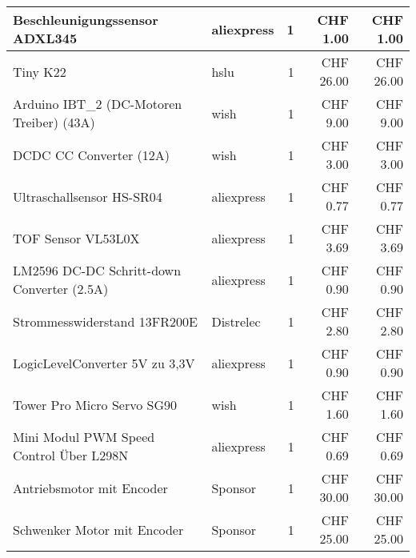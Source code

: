 \documentclass[../../main.tex]{subfiles}
\begin{document}
\begin{table}[H]
\begin{tabular}{|p{6cm}|l|r|r|r|}
    Beschleunigungssensor ADXL345                           & aliexpress         & 1               & CHF 1.00            & CHF 1.00              \\ \hline \nocite{AliExpressADXL345}
    Tiny K22                                                & hslu               & 1               & CHF 26.00           & CHF 26.00             \\ \hline
    Arduino IBT\_2 (DC-Motoren Treiber) (43A)               & wish               & 1               & CHF 9.00            & CHF 9.00              \\ \hline \nocite{WisIBT2}
    DC\-DC CC Converter (12A)                               & wish               & 1               & CHF 3.00            & CHF 3.00              \\ \hline \nocite{WishDCDCConverter}
    Ultraschallsensor HS-SR04                               & aliexpress         & 1               & CHF 0.77            & CHF 0.77              \\ \hline \nocite{AliExpressHCSR04}
    TOF Sensor VL53L0X                                      & aliexpress         & 1               & CHF 3.69            & CHF 3.69              \\ \hline \nocite{AliExpressVL53L0X}
    LM2596 DC-DC Schritt-down Converter (2.5A)              & aliexpress         & 1               & CHF 0.90            & CHF 0.90              \\ \hline \nocite{AliExpressLM2596}
    Strommesswiderstand 13FR200E                            & Distrelec          & 1               & CHF 2.80            & CHF 2.80              \\ \hline \nocite{Distrelec13FR200E}
    Logic\-Level\-Converter 5V zu 3,3V                      & aliexpress         & 1               & CHF 0.90            & CHF 0.90              \\ \hline \nocite{AliExpress5V33VConverter}
    Tower Pro Micro Servo SG90                              & wish               & 1               & CHF 1.60            & CHF 1.60              \\ \hline \nocite{WishTowerpro48}
    Mini Modul PWM Speed Control Über L298N                 & aliexpress         & 1               & CHF 0.69            & CHF 0.69              \\ \hline \nocite{WishTowerpro48}
    Antriebsmotor mit Encoder                               & Sponsor            & 1               & CHF 30.00           & CHF 30.00             \\ \hline
    Schwenker Motor mit Encoder                             & Sponsor            & 1               & CHF 25.00           & CHF 25.00             \\ \hline

\end{tabular}
\end{table}
\end{document}

